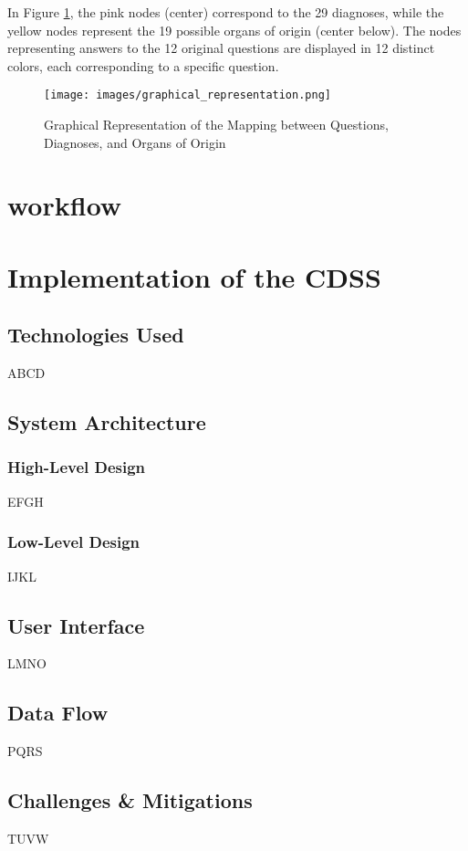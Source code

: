 \noindent In Figure \ref{fig:graphical_representation}, the pink nodes (center) correspond to the 29 diagnoses, while the yellow nodes represent the 19 possible organs of origin (center below). The nodes representing answers to the 12 original questions are displayed in 12 distinct colors, each corresponding to a specific question.

\begin{figure}[h]
    \centering
    \texttt{[image: images/graphical\_representation.png]}
    \caption{Graphical Representation of the Mapping between Questions, Diagnoses, and Organs of Origin}
    \label{fig:graphical_representation}
\end{figure}

\section{workflow}
\lipsum[1]
\section{Implementation of the CDSS}
\subsection{Technologies Used}
ABCD %
\subsection{System Architecture}
\subsubsection{High-Level Design}
EFGH
\subsubsection{Low-Level Design}
IJKL
\subsection{User Interface}
LMNO %
\subsection{Data Flow}
PQRS
\subsection{Challenges \& Mitigations}
TUVW %
